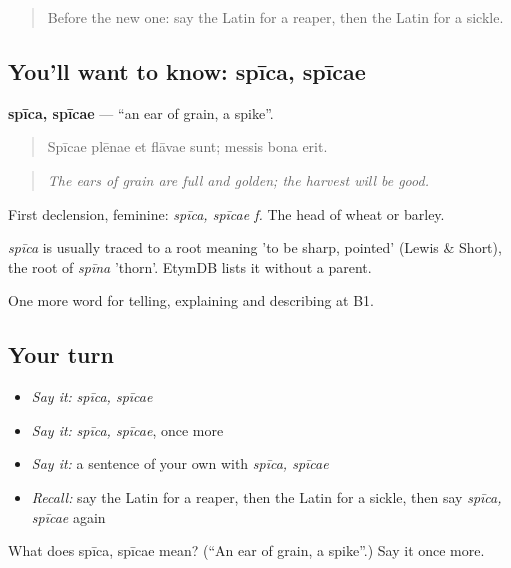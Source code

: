 \label{lesson:LA-C475-spica}



\begin{quote}
Before the new one: say the Latin for a reaper, then the Latin for a sickle.
\end{quote}

\subsection*{You'll want to know: spīca, spīcae}
\textbf{spīca, spīcae} — \textquotedblleft{}an ear of grain, a spike\textquotedblright{}.

\begin{quote}
Spīcae plēnae et flāvae sunt; messis bona erit.
\end{quote}

\begin{quote}
\emph{The ears of grain are full and golden; the harvest will be good.}
\end{quote}

First declension, feminine: \emph{spīca, spīcae f.} The head of wheat or barley.

\begin{cousinweb}
\emph{spīca} is usually traced to a root meaning 'to be sharp, pointed' (Lewis \& Short), the root of \emph{spīna} 'thorn'. EtymDB lists it without a parent.
\end{cousinweb}

\begin{grammarlens}[title={What you've built}]
One more word for telling, explaining and describing at B1.
\end{grammarlens}

\subsection*{Your turn}
\begin{itemize}
\raggedright
  \item \emph{Say it:} \emph{spīca, spīcae}
  \item \emph{Say it:} \emph{spīca, spīcae}, once more
  \item \emph{Say it:} a sentence of your own with \emph{spīca, spīcae}
  \item \emph{Recall:} say the Latin for a reaper, then the Latin for a sickle, then say \emph{spīca, spīcae} again
\end{itemize}

\begin{tcolorbox}[breakable,colback=teal!4,colframe=teal!35!black,title={Before you move on}]
What does spīca, spīcae mean? (\textquotedblleft{}An ear of grain, a spike\textquotedblright{}.) Say it once more.
\end{tcolorbox}
